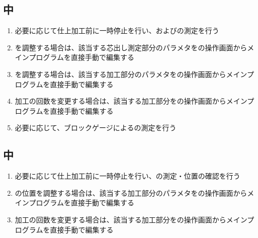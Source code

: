 \subsection{\KeywayMilling 中}
\begin{enumerate}[label=\sarrow]
\item 必要に応じて仕上加工前に一時停止を行い、\AsideKeywayDepth および\KeywayDiameter の測定を行う
\item \AsideKeywayDepth を調整する場合は、該当する芯出し測定部分のパラメタを\MMC の操作画面からメインプログラムを直接手動で編集する
\item \KeywayDiameter を調整する場合は、該当する加工部分のパラメタを\MMC の操作画面からメインプログラムを直接手動で編集する
\item {}加工の回数を変更する場合は、該当する加工部分を\MMC の操作画面からメインプログラムを直接手動で編集する
\item 必要に応じて、ブロックゲージによる\KeywayWidth の測定を行う
\end{enumerate}


\subsection{\EndFaceCChamferMilling 中}
\begin{enumerate}[label=\sarrow]
\item 必要に応じて仕上加工前に一時停止を行い、\EndFaceOutCChamfer の測定・位置の確認を行う
\item \EndFaceOutCChamfer の位置を調整する場合は、該当する加工部分のパラメタを\MMC の操作画面からメインプログラムを直接手動で編集する
\item {}加工の回数を変更する場合は、該当する加工部分を\MMC の操作画面からメインプログラムを直接手動で編集する
\end{enumerate}


